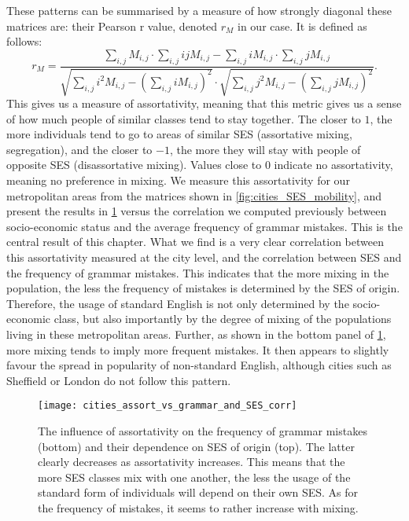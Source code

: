 \documentclass[../thesis.tex]{subfiles}
\begin{document}
These patterns can be summarised by a measure of how strongly diagonal these matrices
are: their Pearson r value, denoted $r_M$ in our case. It is defined as follows:
\begin{equation}
  \label{eq:def_mobility_r}
  r_M = \frac{
      \sum_{i, j} M_{i, j} \cdot \sum_{i, j} i j M_{i, j}
      - \sum_{i, j} i M_{i, j} \cdot \sum_{i, j} j M_{i, j}
    }{
      \sqrt{\sum_{i, j} i^2 M_{i, j} - \left( \sum_{i, j} i M_{i, j} \right)^2}
      \cdot \sqrt{\sum_{i, j} j^2 M_{i, j} - \left( \sum_{i, j} j M_{i, j} \right)^2}
    }.
\end{equation}
This gives us a measure of assortativity, meaning that this metric gives us a sense of
how much people of similar classes tend to stay together. The closer to $1$, the more
individuals tend to go to areas of similar \ac{SES} (assortative mixing, segregation),
and the closer to $-1$, the more they will stay with people of opposite \ac{SES}
(disassortative mixing). Values close to $0$ indicate no assortativity, meaning no
preference in mixing. We measure this assortativity for our metropolitan areas from the
matrices shown in \cref{fig:cities_SES_mobility}, and present the results in
\cref{fig:cities_assort_vs_grammar_and_SES_corr} versus the correlation we computed
previously between socio-economic status and the average frequency of grammar mistakes.
This is the central result of this chapter. What we find is a very clear correlation
between this assortativity measured at the city level, and the correlation between
\ac{SES} and the frequency of grammar mistakes. This indicates that the more mixing in
the population, the less the frequency of mistakes is determined by the \ac{SES} of
origin. Therefore, the usage of standard English is not only determined by the
socio-economic class, but also importantly by the degree of mixing of the populations
living in these metropolitan areas. Further, as shown in the bottom panel of
\cref{fig:cities_assort_vs_grammar_and_SES_corr}, more mixing tends to imply more
frequent mistakes. It then appears to slightly favour the spread in popularity of
non-standard English, although cities such as Sheffield or London do not follow this
pattern.
\begin{figure}
\centering
  \texttt{[image: cities\_assort\_vs\_grammar\_and\_SES\_corr]}
  \caption{The influence of assortativity on the frequency of grammar mistakes (bottom)
  and their dependence on \ac{SES} of origin (top). The latter clearly decreases as
  assortativity increases. This means that the more \ac{SES} classes mix with one
  another, the less the usage of the standard form of individuals will depend on their
  own \ac{SES}. As for the frequency of mistakes, it seems to rather increase with
  mixing.}
  \label{fig:cities_assort_vs_grammar_and_SES_corr}
\end{figure}
\end{document}
